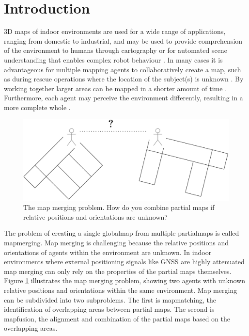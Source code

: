 
\section{Introduction}

3D \gls{map}s of indoor environments are used for a wide range of applications, ranging from domestic to industrial, and may be used to provide comprehension of the environment to humans through cartography or for automated scene understanding that enables complex robot behaviour \citep{chen_indoor_2020,wang_safe_2019,hermann_design_2016}. In many cases it is advantageous for multiple mapping agents to collaboratively create a map, such as during rescue operations where the location of the subject(s) is unknown \citep{queralta_collaborative_2020}. By working together larger areas can be mapped in a shorter amount of time \citep{lajoie_towards_2022}. Furthermore, each agent may perceive the environment differently, resulting in a more complete whole \citep{schuster_arches_2020}.

\begin{figure}[h]
    \centering
    \includegraphics*[width=.7\textwidth]{./fig/overview_diagrams-Page-4.drawio.pdf}
    \caption{The map merging problem. How do you combine partial maps if relative positions and orientations are unknown?}
    \label{fig:map_merging}
\end{figure}

The problem of creating a single \gls{globalmap} from multiple \gls{partialmap}s is called \gls{mapmerging}. Map merging is challenging because the relative positions and orientations of agents within the environment are unknown. In indoor environments where external positioning signals like GNSS are highly attenuated map merging can only rely on the properties of the partial maps themselves. Figure \ref{fig:map_merging} illustrates the map merging problem, showing two agents with unknown relative positions and orientations within the same environment. Map merging can be subdivided into two subproblems. The first is \gls{mapmatching}, the identification of overlapping areas between partial maps. The second is \gls{mapfusion}, the alignment and combination of the partial maps based on the overlapping areas. 

